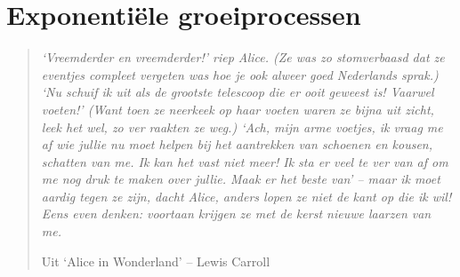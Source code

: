 %                           
%
%
%                   
%                                               
%             
%     



\chapter{Exponenti\"{e}le groeiprocessen}\label{chap:groei}
\begin{quote}
     \textit{{\small `Vreemderder en vreemderder!' riep Alice. (Ze was zo stomverbaasd
              dat ze eventjes compleet vergeten was hoe je ook alweer goed
              Nederlands sprak.) `Nu schuif ik uit als de grootste telescoop die
              er ooit geweest is! Vaarwel voeten!' (Want toen ze neerkeek op haar
              voeten waren ze bijna uit zicht, leek het wel, zo ver raakten ze
              weg.) `Ach, mijn arme voetjes, ik vraag me af wie jullie nu moet
              helpen bij het aantrekken van schoenen en kousen, schatten van me.
              \emph{Ik} kan het vast niet meer! Ik sta er veel te ver van af om
              me nog druk te maken over jullie. Maak er het beste van' -- maar
              ik moet aardig tegen ze zijn, dacht Alice, anders lopen ze niet
              de kant op die ik wil! Eens even denken: voortaan krijgen ze met
              de kerst nieuwe laarzen van me.}}

          Uit `Alice in Wonderland' -- Lewis Carroll
\end{quote}


